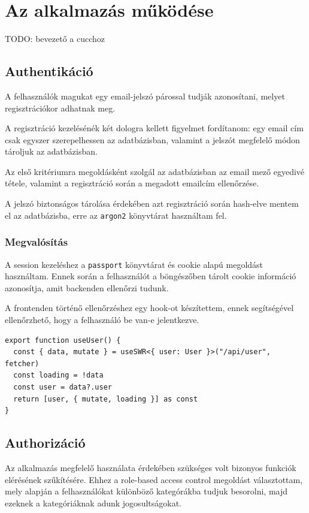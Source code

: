 \chapter{Az alkalmazás működése}

TODO: bevezető a cucchoz

\section{Authentikáció}

A felhasználók magukat egy email-jelszó párossal tudják azonosítani, melyet regisztrációkor adhatnak meg.

A regisztráció kezelésénék két dologra kellett figyelmet fordítanom: egy email cím csak egyszer szerepelhessen
az adatbázisban, valamint a jelszót megfelelő módon tároljuk az adatbázisban.

Az első kritériumra megoldásként szolgál az adatbázisban az email mező egyedivé tétele, valamint a regisztráció során
a megadott emailcím ellenőrzése.

A jelszó biztonságos tárolása érdekében azt regisztráció során hash-elve mentem el az adatbázisba, erre az \lstinline|argon2| könyvtárat
használtam fel.

\subsection{Megvalósítás}

A session kezeléshez a \lstinline|passport| könyvtárat és cookie alapú megoldást használtam. Ennek során a felhasználót a böngészőben
tárolt cookie információ azonosítja, amit backenden ellenőrzi tudunk.

A frontenden történő ellenőrzéshez egy hook-ot készítettem, ennek segítségével ellenőrzhető, hogy a felhasználó be van-e jelentkezve.

\begin{lstlisting}[caption=Authentikáció hook]
export function useUser() {
  const { data, mutate } = useSWR<{ user: User }>("/api/user", fetcher)
  const loading = !data
  const user = data?.user
  return [user, { mutate, loading }] as const
}
\end{lstlisting}

\section{Authorizáció}

Az alkalmazás megfelelő használata érdekében szükséges volt bizonyos funkciók elérésének szűkítésére. Ehhez a role-based access control
megoldást választottam, mely alapján a felhasználókat különböző kategórákba tudjuk besorolni, majd ezeknek a kategóriáknak adunk jogosultságokat.

